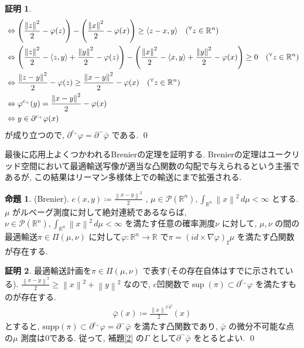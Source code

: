 \documentclass[10pt, fleqn, label-section=none, titlepage]{bxjsarticle}
\theoremstyle{definition}
\newtheorem{prop}[dfn]{命題}
\newtheorem*{pf*}{証明}
\newcommand{\any}{{}^{\forall}}
\newcommand{\paren}[1]{\mleft( #1\mright )}
\newcommand{\tbra}[1]{\mleft\langle#1\mright\rangle}
\newcommand{\norm}[1]{\left\|#1\right\|}
\newcommand{\LR}{\Leftrightarrow}
\newcommand{\supp}{\textrm{supp}}
\renewcommand{\;}{\, ; \,}
\renewcommand{\d}{\, {d}}
\begin{document}
\begin{pf*}
\begin{align*}
 &\LR \paren{\frac{\norm z^2}{2} - \varphi(z)} - \paren{\frac{\norm x^2}{2} - \varphi(x)} \geq \tbra{z-x,y} \quad (\any z \in \mathbb R ^n) \\
 &\LR \paren{\frac{\norm z^2}{2} - \tbra{z,y} +\frac{\norm y^2}{2} - \varphi(z)} - \paren{\frac{\norm x^2}{2} - \tbra{x,y} + \frac{\norm y^2}{2} - \varphi(x)} \geq 0 \quad (\any z \in \mathbb R^n) \\
 &\LR \frac{\norm{z-y} ^2}{2} - \varphi(z) \geq \frac{\norm{x-y} ^2}{2} - \varphi(x) \quad(\any z \in \mathbb R ^n) \\
 &\LR \varphi^{c_+}(y) = \frac{\norm{x-y} ^2}{2} - \varphi(x) \\
 &\LR y \in \partial ^{c_+} \varphi(x)
 \end{align*}
 が成り立つので, $\partial ^{c_+} \varphi = \partial^{-} \bar \varphi$ である. 
\qed
\end{pf*}

最後に応用上よくつかわれるBrenierの定理を証明する. Brenierの定理はユークリッド空間において最適輸送写像が適当な凸関数の勾配で与えられるという主張であるが, この結果はリーマン多様体上での輸送にまで拡張される.

\begin{prop}(Brenier).
$c(x,y) \coloneqq \frac{\norm{x-y}^2}{2}$ , $\mu \in \mathcal P (\mathbb R ^n) , \int_{\mathbb R ^n} \norm x ^2 \d \mu < \infty$ とする. $\mu$ がルベーグ測度に対して絶対連続であるならば, $\nu \in \mathcal P (\mathbb R ^n), \int_{\mathbb R ^n} \norm x ^2 \d \mu < \infty$ を満たす任意の確率測度$\nu$ に対して, $\mu, \nu$ の間の最適輸送$\pi \in \Pi (\mu, \nu)$ に対して$\varphi: \mathbb R ^n \rightarrow \mathbb R $ で$\pi = (id \times \nabla \varphi) _\sharp \mu$ を満たす凸関数が存在する.
\end{prop}
\begin{pf*}
最適輸送計画を$\pi \in \Pi(\mu, \nu)$ で表す(その存在自体はすでに示されている). $\frac{\norm{x-y} ^2}{2} \ge \norm x ^2 + \norm y ^2$ なので, $c$凹関数で$\sup(\pi) \subset \partial ^{c_+} \varphi$ を満たすものが存在する.
\begin{align*} \bar \varphi(x) \coloneqq \frac{\norm x ^2}{2} ^ \varphi (x)  \end{align*}
とすると, $\supp (\pi) \subset \partial ^{c_+} \varphi = \partial^- \bar \varphi$ を満たす凸関数であり, $\bar \varphi $ の微分不可能な点の$\mu$ 測度は$0$である. 従って, 補題\ref{2} の$\Gamma$ として$\partial^- \bar \varphi$ をとるとよい. 
\qed
\end{pf*}
\end{document}
